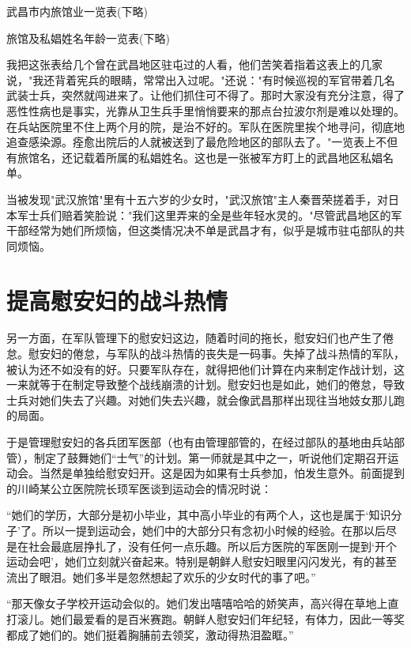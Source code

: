 \documentclass[12pt,UTF8]{ctexbook}
\begin{document}
武昌市内旅馆业一览表(下略)



旅馆及私娼姓名年龄一览表(下略)



我把这张表给几个曾在武昌地区驻屯过的人看，他们苦笑着指着这表上的几家说，"我还背着宪兵的眼睛，常常出入过呢。"还说："有时候巡视的军官带着几名武装士兵，突然就闯进来了。让他们抓住可不得了。那时大家没有充分注意，得了恶性性病也是事实，光靠从卫生兵手里悄悄要来的那点台拉波尔剂是难以处理的。在兵站医院里不住上两个月的院，是治不好的。军队在医院里挨个地寻问，彻底地追查感染源。痊愈出院后的人就被送到了最危险地区的部队去了。"一览表上不但有旅馆名，还记载着所属的私娼姓名。这也是一张被军方盯上的武昌地区私娼名单。



当被发现"武汉旅馆"里有十五六岁的少女时，"武汉旅馆"主人秦晋荣搓着手，对日本军士兵们赔着笑脸说："我们这里弄来的全是些年轻水灵的。"尽管武昌地区的军干部经常为她们所烦恼，但这类情况决不单是武昌才有，似乎是城市驻屯部队的共同烦恼。






\section{提高慰安妇的战斗热情}

另一方面，在军队管理下的慰安妇这边，随着时间的拖长，慰安妇们也产生了倦怠。慰安妇的倦怠，与军队的战斗热情的丧失是一码事。失掉了战斗热情的军队，被认为还不如没有的好。只要军队存在，就得把他们计算在内来制定作战计划，这一来就等于在制定导致整个战线崩溃的计划。慰安妇也是如此，她们的倦怠，导致士兵对她们失去了兴趣。对她们失去兴趣，就会像武昌那样出现往当地妓女那儿跑的局面。

于是管理慰安妇的各兵团军医部（也有由管理部管的，在经过部队的基地由兵站部管），制定了鼓舞她们“士气”的计划。第一师就是其中之一，听说他们定期召开运动会。当然是单独给慰安妇开。这是因为如果有士兵参加，怕发生意外。前面提到的川崎某公立医院院长顼军医谈到运动会的情况时说：

“她们的学历，大部分是初小毕业，其中高小毕业的有两个人，这也是属于‘知识分子’了。所以一提到运动会，她们中的大部分只有念初小时候的经验。在那以后尽是在社会最底层挣扎了，没有任何一点乐趣。所以后方医院的军医刚一提到‘开个运动会吧’，她们立刻就兴奋起来。特别是朝鲜人慰安妇眼里闪闪发光，有的甚至流出了眼泪。她们多半是忽然想起了欢乐的少女时代的事了吧。”

“那天像女子学校开运动会似的。她们发出嘻嘻哈哈的娇笑声，高兴得在草地上直打滚儿。她们最爱看的是百米赛跑。朝鲜人慰安妇们年纪轻，有体力，因此一等奖都成了她们的。她们挺着胸脯前去领奖，激动得热泪盈眶。”
\end{document}
